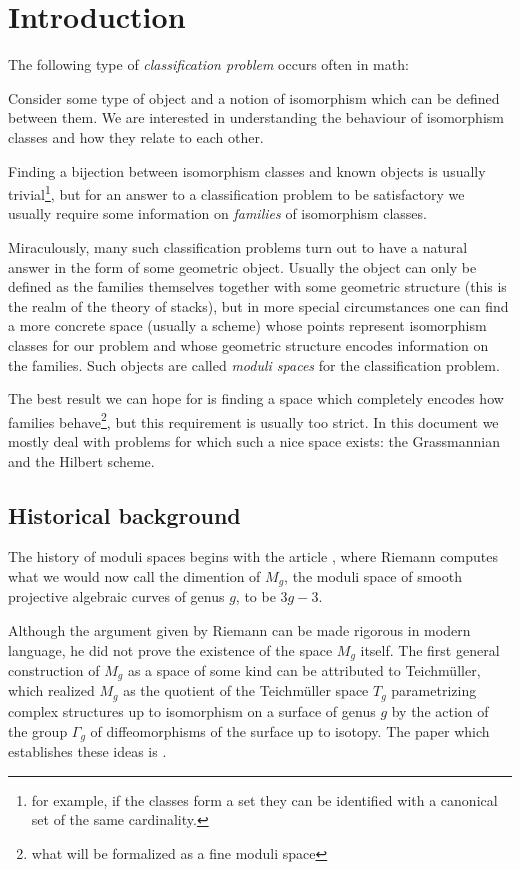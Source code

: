 \chapter*{Introduction}
The following type of \textit{classification problem} occurs often in math:
\begin{center}
Consider some type of object and a notion of isomorphism which can be defined between them. We are interested in understanding the behaviour of isomorphism classes and how they relate to each other.
\end{center}
Finding a bijection between isomorphism classes and known objects is usually trivial\footnote{for example, if the classes form a set they can be identified with a canonical set of the same cardinality.}, but for an answer to a classification problem to be satisfactory we usually require some information on \textit{families} of isomorphism classes.\medskip

Miraculously, many such classification problems turn out to have a natural answer in the form of some geometric object. Usually the object can only be defined as the families themselves together with some geometric structure (this is the realm of the theory of stacks), but in more special circumstances one can find a more concrete space (usually a scheme) whose points represent isomorphism classes for our problem and whose geometric structure encodes information on the families. Such objects are called \textit{moduli spaces} for the classification problem.\medskip

The best result we can hope for is finding a space which completely encodes how families behave\footnote{what will be formalized as a fine moduli space}, but this requirement is usually too strict.
In this document we mostly deal with problems for which such a nice space exists: the Grassmannian and the Hilbert scheme.\medskip



\section*{Historical background}
The history of moduli spaces begins with the article \cite{riemann54theorie}, where Riemann computes what we would now call the dimention of $M_g$, the moduli space of smooth projective algebraic curves of genus $g$, to be $3g-3$.\medskip

Although the argument given by Riemann can be made rigorous in modern language, he did not prove the existence of the space $M_g$ itself. The first general construction of $M_g$ as a space of some kind can be attributed to Teichm\"uller, which realized $M_g$ as the quotient of the Teichm\"uller space $T_g$ parametrizing complex structures up to isomorphism on a surface of genus $g$ by the action of the group $\Gamma_g$ of diffeomorphisms of the surface up to isotopy. The paper which establishes these ideas is \cite{teichmuller1939extremale}.\medskip

